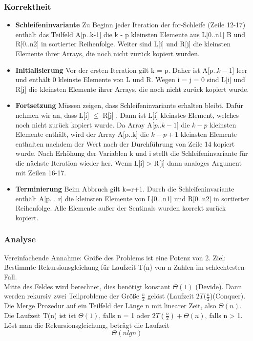 \documentclass[jou,apacite]{apa6}
\begin{document}
\subsubsection{Korrektheit}
\begin{itemize}
\item {\bfseries Schleifeninvariante} Zu Beginn jeder Iteration der for-Schleife (Zeile 12-17) enthält das Teilfeld A[p..k-1] die k - p kleinsten Elemente aus L[0..n1] B und R[0..n2] in sortierter Reihenfolge. Weiter sind L[i] und R[j] die kleinsten Elemente ihrer Arrays, die noch nicht zurück kopiert wurden. 
\item {\bfseries Initialisierung} Vor der ersten Iteration gilt k = p. Daher ist A[p..$k-1$] leer und enthält 0 kleinste Elemente von L und R. Wegen i = j = 0 sind L[i] und R[j] die kleinsten Elemente ihrer Arrays, die noch nicht zurück kopiert wurde.
\item {\bfseries Fortsetzung} Müssen zeigen, dass Schleifeninvariante erhalten bleibt. Dafür nehmen
wir an, dass L[i] $\le$ R[j] . Dann ist L[i] kleinstes Element, welches noch nicht zurück
kopiert wurde. Da Array A[$p..k-1$] die $k-p$ kleinsten Elemente enthält, wird der
Array A[p..k] die $k-p+1$ kleinsten Elemente enthalten nachdem der Wert nach der
Durchführung von Zeile 14 kopiert wurde. Nach Erhöhung der Variablen k und i stellt
die Schleifeninvariante für die nächste Iteration wieder her.
Wenn L[i] > R[j] dann analoges Argument mit Zeilen 16-17.
\item {\bfseries Terminierung} Beim Abbruch gilt k=r+1. Durch die Schleifeninvariante enthält A[p. . r] die kleinsten Elemente von L[0...n1] und R[0..n2] in sortierter Reihenfolge. Alle Elemente außer der Sentinals wurden korrekt zurück kopiert.
\end{itemize}

\subsubsection{Analyse}
Vereinfachende Annahme: Größe des Problems ist eine Potenz von 2. Ziel: Bestimmte Rekursionsgleichung für Laufzeit T(n) von n Zahlen im schlechtesten Fall.
\\
Mitte des Feldes wird berechnet, dies benötigt konstant $\Theta(1)$ (Devide). Dann werden rekursiv zwei Teilprobleme der Größe $\frac{n}{2}$ gelöst (Laufzeit $2T(\frac{n}{2}$)(Conquer). Die Merge Prozedur auf ein Teilfeld der Länge n mit linearer Zeit, also $\Theta(n)$. Die Laufzeit T(n) ist ist $\Theta(1)$, falls n = 1 oder $2T(\frac{n}{2})+\Theta(n)$, falls n > 1. Löst man die Rekursionsgleichung, beträgt die Laufzeit  $$\Theta(n lg n)$$
\end{document}
